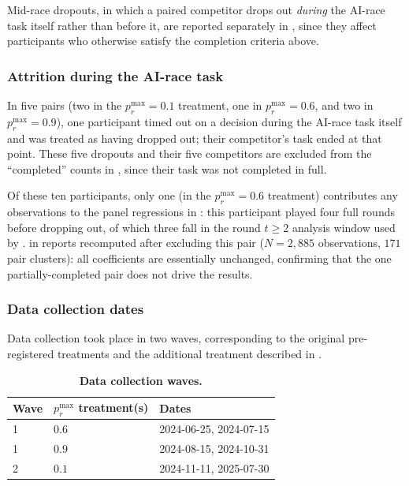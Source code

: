 \documentclass[pdflatex,sn-mathphys-ay]{sn-jnl}
\theoremstyle{thmstyleone}
\theoremstyle{thmstyletwo}
\theoremstyle{thmstylethree}
\begin{document}
Mid-race dropouts, in which a paired competitor drops out \emph{during} the AI-race task itself rather than before it, are reported separately in , since they affect participants who otherwise satisfy the completion criteria above.

\subsubsection{Attrition during the AI-race task}
\label{si:sec:attrition}

In five pairs (two in the \(p_r^{\max}=0.1\) treatment, one in \(p_r^{\max}=0.6\), and two in \(p_r^{\max}=0.9\)), one participant timed out on a decision during the AI-race task itself and was treated as having dropped out; their competitor's task ended at that point. These five dropouts and their five competitors are excluded from the ``completed'' counts in , since their task was not completed in full.

Of these ten participants, only one (in the \(p_r^{\max}=0.6\) treatment) contributes any observations to the panel regressions in : this participant played four full rounds before dropping out, of which three fall in the round \(t\geq2\) analysis window used by .  in  reports  recomputed after excluding this pair (\(N=2{,}885\) observations, \(171\) pair clusters): all coefficients are essentially unchanged, confirming that the one partially-completed pair does not drive the results.

\subsubsection{Data collection dates}
\label{si:sec:dates}

Data collection took place in two waves, corresponding to the original pre-registered treatments and the additional treatment described in .
\begin{table}[h]
\centering
\caption{\textbf{Data collection waves.}}
\label{tab:si:collection-dates}
\begin{tabular}{lll}
\toprule
Wave & \(p_r^{\max}\) treatment(s) & Dates \\
\midrule
1 & \(0.6\) & 2024-06-25, 2024-07-15 \\
1 & \(0.9\) & 2024-08-15, 2024-10-31 \\
2 & \(0.1\) & 2024-11-11, 2025-07-30 \\
\bottomrule
\end{tabular}
\end{table}
\end{document}
